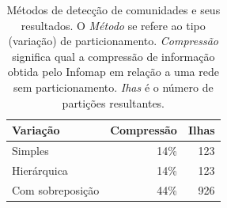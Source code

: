 \documentclass[
  article,
  11pt,
  a4paper,
  english,
  brazil,
  sumario=tradicional]{abntex2}
\begin{document}

\begin{table}
  \centering
  \begin{tabular}{@{} l r r @{}}
    \toprule
    Variação         & Compressão & Ilhas  \\
    \midrule
    Simples          & 14\%       & 123     \\
    Hierárquica      & 14\%       & 123     \\
    Com sobreposição & 44\%       & 926     \\
    \bottomrule
  \end{tabular}
  \caption{Métodos de detecção de comunidades e seus resultados. O \textit{Método} se refere ao tipo (variação) de particionamento. \textit{Compressão} significa qual a compressão de informação obtida pelo Infomap em relação a uma rede sem particionamento. \textit{Ihas} é o número de partições resultantes.}
  \label{tab:metodos}
\end{table}
\end{document}
